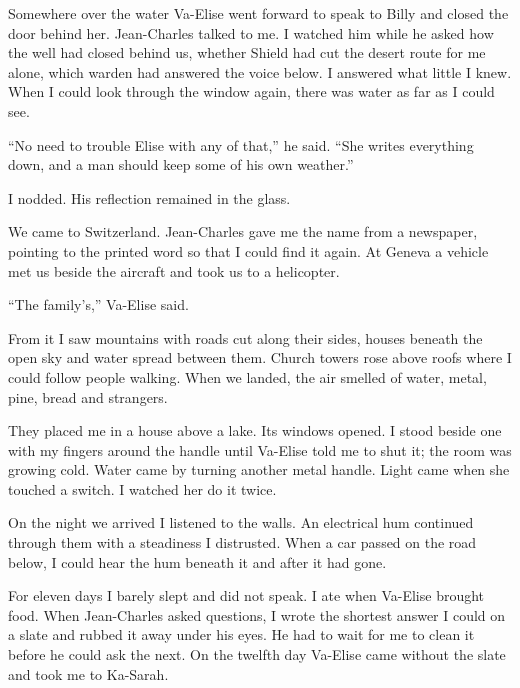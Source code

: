 Somewhere over the water Va-Elise went forward to speak to Billy and closed the door behind her. Jean-Charles talked to me. I watched him while he asked how the well had closed behind us, whether Shield had cut the desert route for me alone, which warden had answered the voice below. I answered what little I knew. When I could look through the window again, there was water as far as I could see.\par

``No need to trouble Elise with any of that,'' he said. ``She writes everything down, and a man should keep some of his own weather.''\par

I nodded. His reflection remained in the glass.\par

We came to Switzerland. Jean-Charles gave me the name from a newspaper, pointing to the printed word so that I could find it again. At Geneva a vehicle met us beside the aircraft and took us to a helicopter.\par

``The family's,'' Va-Elise said.\par

From it I saw mountains with roads cut along their sides, houses beneath the open sky and water spread between them. Church towers rose above roofs where I could follow people walking. When we landed, the air smelled of water, metal, pine, bread and strangers.\par

They placed me in a house above a lake. Its windows opened. I stood beside one with my fingers around the handle until Va-Elise told me to shut it; the room was growing cold. Water came by turning another metal handle. Light came when she touched a switch. I watched her do it twice.\par

On the night we arrived I listened to the walls. An electrical hum continued through them with a steadiness I distrusted. When a car passed on the road below, I could hear the hum beneath it and after it had gone.\par

For eleven days I barely slept and did not speak. I ate when Va-Elise brought food. When Jean-Charles asked questions, I wrote the shortest answer I could on a slate and rubbed it away under his eyes. He had to wait for me to clean it before he could ask the next. On the twelfth day Va-Elise came without the slate and took me to Ka-Sarah.\par


